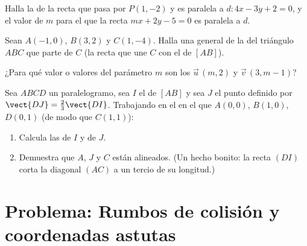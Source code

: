 \begin{exercise}[$\star\star$]\label{exo:g11:vect:8}
Halla la  de la recta que pasa por $P(1, -2)$ y es paralela a
$d: 4x - 3y + 2 = 0$, y el valor de $m$ para el que la recta
$mx + 2y - 5 = 0$ es paralela a $d$.
\end{exercise}

\begin{exercise}[$\star\star$]\label{exo:g11:vect:9}
Sean $A(-1, 0)$, $B(3, 2)$ y $C(1, -4)$. Halla una  general de la
\emph{} del triángulo $ABC$ que parte de $C$ (la recta que une $C$
con el  de $[AB]$).
\end{exercise}

\begin{exercise}[$\star\star$]\label{exo:g11:vect:10}
¿Para qué valor o valores del parámetro $m$ son  los 
$\vec u\,(m, 2)$ y $\vec v\,(3, m - 1)$?
\end{exercise}

\begin{exercise}[$\star\star\star$]\label{exo:g11:vect:11}
Sea $ABCD$ un paralelogramo, sea $I$ el  de $[AB]$ y sea $J$ el
punto definido por $\vect{DJ} = \frac23 \vect{DI}$. Trabajando en el
 en el que $A(0,0)$, $B(1,0)$, $D(0,1)$ (de modo que
$C(1,1)$):
\begin{enumerate}
  \item Calcula las  de $I$ y de $J$.
  \item Demuestra que $A$, $J$ y $C$ están alineados. (Un hecho bonito: la
        recta $(DI)$ corta la diagonal $(AC)$ a un tercio de su
        longitud.)
\end{enumerate}
\end{exercise}

\section{Problema: Rumbos de colisión y coordenadas astutas}

